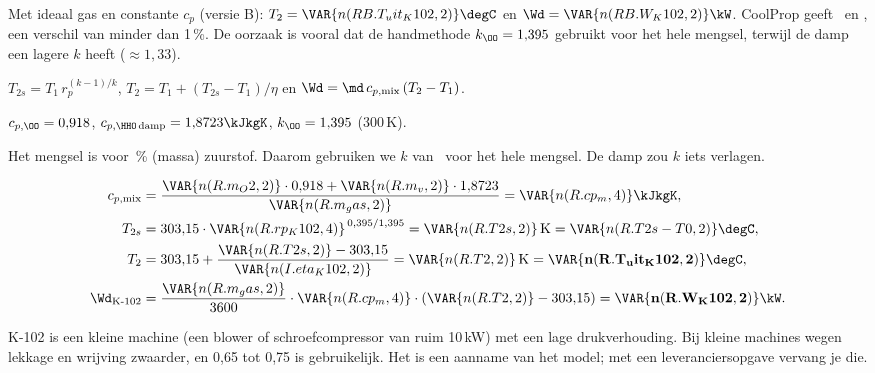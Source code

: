 \begin{coolprop}
Met ideaal gas en constante $c_p$ (versie B): $T_2 = \VAR{n(RB.T_uit_K102,2)}\degC$ en $\Wd = \VAR{n(RB.W_K102,2)}\kW$. CoolProp geeft
\degC\ en \kW, een verschil van minder dan 1\,\%. De oorzaak is vooral dat de
handmethode $k_{\OO} = 1{,}395$ gebruikt voor het hele mengsel, terwijl de damp een lagere $k$ heeft ($\approx 1{,}33$).
\end{coolprop}
\begin{methode}
$T_{2s} = T_1\,r_p^{(k-1)/k}$, $T_2 = T_1 + (T_{2s}-T_1)/\eta$ en $\Wd = \md\,c_{p,\mathrm{mix}}\,(T_2-T_1)$.
\end{methode}
\begin{tabelkader}[A-2]
$c_{p,\OO} = 0{,}918$, $c_{p,\HHO\,\mathrm{damp}} = 1{,}8723\kJkgK$, $k_{\OO} = 1{,}395$ (300\,K).
\end{tabelkader}
\begin{aanname}
Het mengsel is voor \,\% (massa) zuurstof. Daarom gebruiken we $k$ van \OO\ voor het hele
mengsel. De damp zou $k$ iets verlagen.
\end{aanname}
\begin{align*}
c_{p,\mathrm{mix}} &= \frac{\VAR{n(R.m_O2,2)}\cdot 0{,}918 + \VAR{n(R.m_v,2)}\cdot 1{,}8723}{\VAR{n(R.m_gas,2)}} = \VAR{n(R.cp_m,4)}\kJkgK,\\
T_{2s} &= 303{,}15\cdot\VAR{n(R.rp_K102,4)}^{\,0{,}395/1{,}395} = \VAR{n(R.T2s,2)}\,\mathrm{K} = \VAR{n(R.T2s - T0,2)}\degC,\\
T_2 &= 303{,}15 + \frac{\VAR{n(R.T2s,2)} - 303{,}15}{\VAR{n(I.eta_K102,2)}} = \VAR{n(R.T2,2)}\,\mathrm{K} = \mathbf{\VAR{n(R.T_uit_K102,2)}\degC},\\
\Wd_{\text{K-102}} &= \frac{\VAR{n(R.m_gas,2)}}{3600}\cdot\VAR{n(R.cp_m,4)}\cdot(\VAR{n(R.T2,2)} - 303{,}15) = \mathbf{\VAR{n(R.W_K102,2)}\kW}.
\end{align*}
\begin{waarom}[$\eta = 0{,}70$]
K-102 is een kleine machine (een blower of schroefcompressor van ruim 10\,kW) met een lage drukverhouding. Bij
kleine machines wegen lekkage en wrijving zwaarder, en 0,65 tot 0,75 is gebruikelijk. Het is een aanname van het
model; met een leveranciersopgave vervang je die.
\end{waarom}

